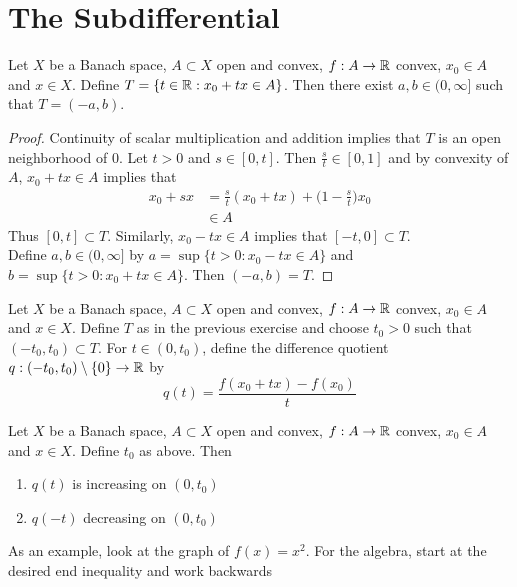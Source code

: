 \documentclass{book}
\begin{document}
	
	
	
	
	
	
	\newpage
	\section{The Subdifferential}
	
	\begin{ex} \lex{}
	Let $X$ be a Banach space, $A \subset X$ open and convex, $f:A \rightarrow \mathbb{R}$ convex, $x_0 \in A$ and $x \in X$. Define $T = \{ t \in \mathbb{R}: x_0+tx \in A\}$. Then there exist $a, b \in (0, \infty]$ such that $T = (-a, b)$.
	\end{ex}
	
	\begin{proof}
	Continuity of scalar multiplication and addition implies that $T$ is an open neighborhood of $0$. Let $t > 0$ and $s \in [0,t]$. Then $\frac{s}{t} \in [0, 1]$ and by convexity of $A$, $x_0 + tx \in A$ implies that
	\begin{align*}
	x_0 + sx 
	&= \frac{s}{t}(x_0 + tx) + \bigg(1-\frac{s}{t} \bigg )x_0\\
	& \in A
	\end{align*} 
	Thus $[0,t] \subset T$. Similarly, $x_0 - tx \in A$ implies that $[-t, 0] \subset T$. \\
	Define $a,b \in (0, \infty]$ by $a = \sup \{t > 0: x_0 -tx \in A\}$ and $b = \sup\{t > 0: x_0 +tx \in A\}$. Then $(-a, b) = T$.
	\end{proof}
	
	\begin{defn} \ld{}
	Let $X$ be a Banach space, $A \subset X$ open and convex, $f:A \rightarrow \mathbb{R}$ convex, $x_0 \in A$ and $x \in X$. Define $T$ as in the previous exercise and choose $t_0 >0$ such that $(-t_0, t_0) \subset T$. For $t \in (0,t_0)$, define the difference quotient $q: (-t_0, t_0) \setminus \{0\} \rightarrow \mathbb{R}$ by$$q(t) = \frac{f(x_0 + tx) - f(x_0)}{t}$$ 
	\end{defn}	
	
	\begin{ex} \lex{}
	Let $X$ be a Banach space, $A \subset X$ open and convex, $f:A \rightarrow \mathbb{R}$ convex, $x_0 \in A$ and $x \in X$. Define $t_0$ as above.
	Then
	\begin{enumerate}
	\item $q(t)$ is increasing on $(0, t_0)$
	\item $q(-t)$ decreasing on $(0, t_0)$
\end{enumerate}	 
	  As an example, look at the graph of $f(x) = x^2$. For the algebra, start at the desired end inequality and work backwards
	\end{ex}	
	
\end{document}

